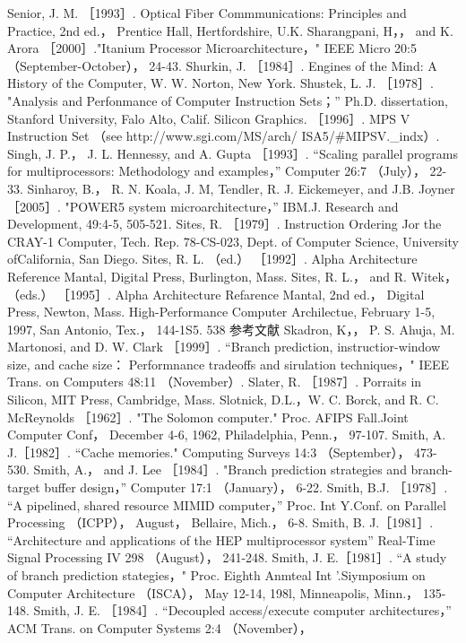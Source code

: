 Senior, J. M. ［1993］. Optical Fiber Commmunications: Principles and Practice, 2nd ed.， Prentice Hall, Hertfordshire, U.K.
Sharangpani, H，， and K. Arora ［2000］."Itanium Processor Microarchitecture，" IEEE Micro 20:5 （September-October）， 24-43.
Shurkin, J. ［1984］. Engines of the Mind: A History of the Computer, W. W. Norton, New York.
Shustek, L. J. ［1978］. "Analysis and Perfonmance of Computer Instruction Sets；” Ph.D. dissertation, Stanford University, Falo
Alto, Calif.
Silicon Graphics. ［1996］. MPS V Instruction Set （see http://www.sgi.com/MS/arch/ ISA5/#MIPSV._indx）.
Singh, J. P.， J. L. Hennessy, and A. Gupta ［1993］. “Scaling parallel programs for multiprocessors: Methodology and examples，”
Computer 26:7 （July）， 22-33.
Sinharoy, B.， R. N. Koala, J. M, Tendler, R. J. Eickemeyer, and J.B. Joyner ［2005］. "POWER5 system microarchitecture，” IBM.J.
Research and Development, 49:4-5, 505-521.
Sites, R. ［1979］. Instruction Ordering Jor the CRAY-1 Computer, Tech. Rep. 78-CS-023, Dept. of Computer Science, University
ofCalifornia, San Diego.
Sites, R. L. （ed.） ［1992］. Alpha Architecture Reference Mantal, Digital Press, Burlington, Mass.
Sites, R. L.， and R. Witek， （eds.） ［1995］. Alpha Architecture Refarence Mantal, 2nd ed.， Digital Press, Newton, Mass.
High-Performance Computer Archilectue, February 1-5, 1997, San Antonio, Tex.， 144-1S5.
538
参考文献
Skadron, K，， P. S. Ahuja, M. Martonosi, and D. W. Clark ［1999］. “Branch prediction, instructior-window size, and cache size：
Performnance tradeoffs and sirulation techniques，" IEEE Trans. on Computers 48:11 （November）.
Slater, R. ［1987］. Porraits in Silicon, MIT Press, Cambridge, Mass.
Slotnick, D.L.，W. C. Borck, and R. C. McReynolds ［1962］. "The Solomon computer." Proc. AFIPS Fall.Joint Computer Conf，
December 4-6, 1962, Philadelphia, Penn.， 97-107.
Smith, A. J.［1982］. “Cache memories." Computing Surveys 14:3 （September）， 473-530.
Smith, A.， and J. Lee ［1984］. "Branch prediction strategies and branch-target buffer design，” Computer 17:1 （January）， 6-22.
Smith, B.J. ［1978］. “A pipelined, shared resource MIMID computer，” Proc. Int Y.Conf. on Parallel Processing （ICPP）， August，
Bellaire, Mich.， 6-8.
Smith, B. J.［1981］. “Architecture and applications of the HEP multiprocessor system” Real-Time Signal Processing IV 298
（August）， 241-248.
Smith, J. E.［1981］. “A study of branch prediction stategies，" Proc. Eighth Anmteal Int '.Siymposium on Computer Architecture
（ISCA）， May 12-14, 198l, Minneapolis, Minn.， 135-148.
Smith, J. E. ［1984］. “Decoupled access/execute computer architectures，” ACM Trans. on Computer Systems 2:4 （November），
